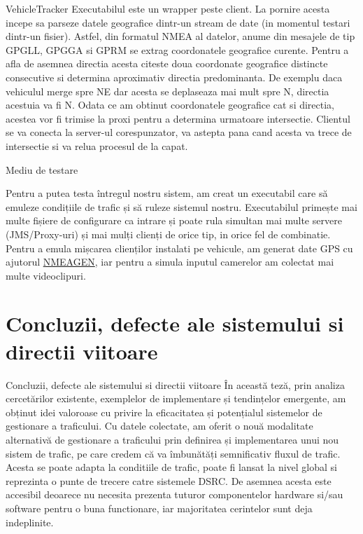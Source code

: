 \documentclass{beamer}
\begin{document}
    \begin{frame}{VehicleTracker}
        Executabilul este un wrapper peste client. La pornire acesta 
        incepe sa parseze datele geografice dintr-un stream de date
        (in momentul testari dintr-un fisier). Astfel, din formatul NMEA
        al datelor, anume din mesajele de tip GPGLL, GPGGA si GPRM se extrag 
        coordonatele geografice curente. Pentru a afla de asemnea directia 
        acesta citeste doua coordonate geografice distincte consecutive si determina 
        aproximativ directia predominanta. De exemplu daca vehiculul merge spre 
        NE dar acesta se deplaseaza mai mult spre N, directia acestuia va fi N.
        Odata ce am obtinut coordonatele geografice cat si directia, acestea 
        vor fi trimise la proxi pentru a determina urmatoare intersectie. 
        Clientul se va conecta la server-ul corespunzator, va astepta 
        pana cand acesta va trece de intersectie si va relua procesul de la capat.
    \end{frame}

    \begin{frame}{Mediu de testare}
        
        Pentru a putea testa întregul nostru sistem, am creat un
        executabil care să emuleze condițiile de trafic și să ruleze
        sistemul nostru. Executabilul primește mai multe fișiere de
        configurare ca intrare și poate rula simultan mai multe servere
        (JMS/Proxy-uri) și mai mulți clienți de orice tip, in orice fel 
        de combinatie. Pentru a emula mișcarea
        clienților instalati pe vehicule, am generat date GPS cu ajutorul
        \href{https://www.nmeagen.org/}{NMEAGEN}, iar pentru a simula
        inputul camerelor am colectat mai multe videoclipuri.
    \end{frame}

\section{Concluzii, defecte ale sistemului si directii viitoare}
    \begin{frame}{Concluzii, defecte ale sistemului si directii viitoare}
        În această teză, prin analiza cercetărilor existente,
        exemplelor de implementare și tendințelor emergente, am obținut
        idei valoroase cu privire la eficacitatea și potențialul
        sistemelor de gestionare a traficului. Cu datele colectate,
        am oferit o nouă modalitate alternativă de gestionare a traficului
        prin definirea și implementarea unui nou sistem de trafic,
        pe care credem că va îmbunătăți semnificativ fluxul de trafic. Acesta 
        se poate adapta la conditiile de trafic, poate fi lansat la nivel global si 
        reprezinta o punte de trecere catre sistemele DSRC. De asemnea acesta 
        este accesibil deoarece nu necesita prezenta tuturor componentelor 
        hardware si/sau software pentru o buna functionare, iar majoritatea 
        cerintelor sunt deja indeplinite.
    \end{frame}
\end{document}
